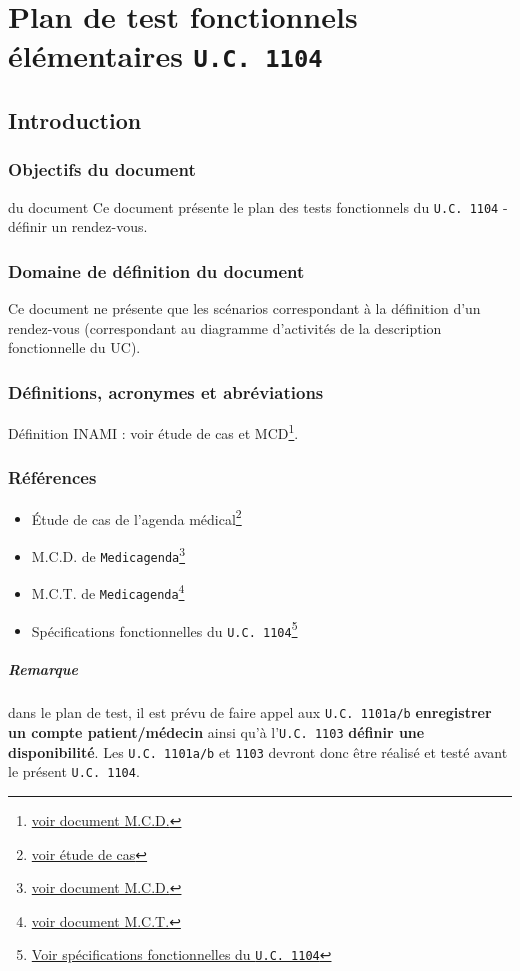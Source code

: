 \documentclass[a4paper, 11pt]{report}
\begin{document}

\tableofcontents
\chapter{Plan de test fonctionnels élémentaires \texttt{U.C. 1104}}
\section{Introduction}
\subsection{Objectifs du document}
du document Ce document présente  le plan des tests fonctionnels du \texttt{U.C. 1104} -
définir un rendez-vous. 
\subsection{Domaine de définition du document}
Ce document ne présente que les scénarios correspondant à la définition d’un
rendez-vous (correspondant au diagramme d’activités de la description fonctionnelle
du UC).
\subsection{Définitions, acronymes et abréviations}
Définition INAMI : voir étude de cas et MCD\footnote{\href{../MCD/MCD.pdf}{voir document M.C.D.}}.
\subsection{Références}
\begin{itemize}
	\item[] Étude de cas de l'agenda
		médical\footnote{\href{../Enonce_Travail_Synthese_14-15.pdf}{voir
		étude de cas}}
	\item[] M.C.D. de \texttt{Medicagenda}\footnote{\href{../MCD/MCD.pdf}{voir document M.C.D.}}
	\item[] M.C.T. de \texttt{Medicagenda}\footnote{\href{./MCT.pdf}{voir document M.C.T.}}
	\item[] Spécifications fonctionnelles du \texttt{U.C.
		1104}\footnote{\href{./specifications_fonctionnelles_UC_1104_definir_un_rendez-vous.pdf}{Voir
			spécifications fonctionnelles du \texttt{U.C. 1104}}}
	\end{itemize}

	\paragraph{Remarque}
	dans le plan de test, il est prévu de faire appel aux \texttt{U.C. 1101a/b} 
	\textbf{enregistrer un compte patient/médecin} ainsi qu'à l'\texttt{U.C. 1103}
    \textbf{définir une disponibilité}.
	Les \texttt{U.C. 1101a/b} et \texttt{1103} devront
	donc être réalisé et testé avant le présent \texttt{U.C. 1104}.
\end{document}
